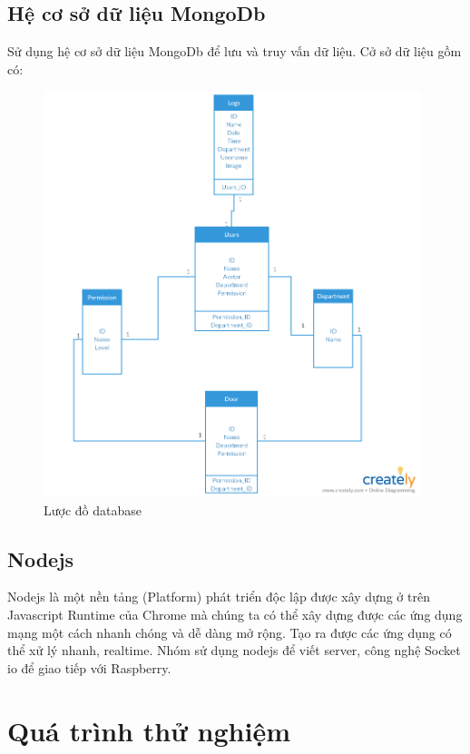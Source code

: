 \documentclass[a4paper]{article}
\begin{document}
\subsection{Hệ cơ sở dữ liệu MongoDb}
\hspace{6mm} Sử dụng hệ cơ sở dữ liệu MongoDb để lưu và truy vấn dữ liệu. Cở sở dữ liệu gồm có:
\\
\begin{figure}[h!]
\begin{center}
\includegraphics[width=11cm]{db_diagram.png}
\\Lược đồ database
\end{center}
\end{figure}
\subsection{Nodejs}
\hspace{6mm} Nodejs là một nền tảng (Platform) phát triển độc lập được xây dựng ở trên Javascript Runtime của Chrome mà chúng ta có thể xây dựng được các ứng dụng mạng một cách nhanh chóng và dễ dàng mở rộng. Tạo ra được các ứng dụng có thể xử lý nhanh, realtime.
Nhóm sử dụng nodejs để viết server, công nghệ Socket io để giao tiếp với Raspberry. 


\section{Quá trình thử nghiệm}
\end{document}
